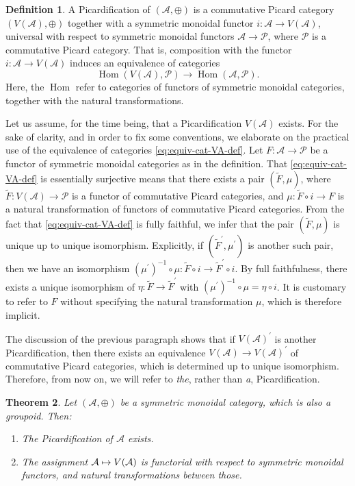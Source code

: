 \documentclass[JEP,XML,SOM,Unicode,published]{cedram}
\newcommand\mto{\mathchoice{\longmapsto}{\mapsto}{\mapsto}{\mapsto}}
\theoremstyle{plain}
\newtheorem{theorem}{Theorem}[section]
\theoremstyle{definition}
\newtheorem{definition}[theorem]{Definition}
\newcommand{\Acal}{\mathcal A}
\newcommand{\Pcal}{\mathcal P}
\DeclareMathOperator{\Hom}{Hom}
\begin{document}
\begin{definition}\label{def:Picardification}
A Picardification of $(\Acal, \oplus)$ is a commutative Picard category $(V(\Acal), \oplus)$ together with a symmetric monoidal functor $i\colon\Acal\to V(\Acal)$, universal with respect to symmetric monoidal functors $\Acal \to \Pcal$, where $\Pcal$ is a commutative Picard category. That is, composition with the functor $i\colon \Acal\to V(\Acal)$ induces an equivalence of categories
\begin{equation}\label{eq:equiv-cat-VA-def}
\Hom(V(\Acal),\Pcal)\to\Hom(\Acal,\Pcal).
\end{equation}
Here, the $\Hom$ refer to categories of functors of symmetric monoidal categories, together with the natural transformations.
\end{definition}
Let us assume, for the time being, that a Picardification $V(\Acal)$ exists. For the sake of clarity, and in order to fix some conventions, we elaborate on the practical use of the equivalence of categories \eqref{eq:equiv-cat-VA-def}. Let $F\colon\Acal\to\Pcal$ be a functor of symmetric monoidal categories as in the definition. That \eqref{eq:equiv-cat-VA-def} is essentially surjective means that there exists a pair $(\widetilde{F},\mu)$, where $\widetilde{F}\colon V(\Acal)\to\Pcal$ is a functor of commutative Picard categories, and $\mu\colon \widetilde{F}\circ i\to F$ is a natural transformation of functors of commutative Picard categories. From the fact that \eqref{eq:equiv-cat-VA-def} is fully faithful, we infer that the pair $(\widetilde{F},\mu)$ is unique up to unique isomorphism. Explicitly, if $(\widetilde{F}^{\prime},\mu^{\prime})$ is another such pair, then we have an isomorphism $(\mu^{\prime})^{-1}\circ\mu\colon \widetilde{F}\circ i\to\widetilde{F}^{\prime}\circ i $. By full faithfulness, there exists a unique isomorphism of $\eta\colon\widetilde{F}\to\widetilde{F}^{\prime}$ with $(\mu^{\prime})^{-1}\circ\mu=\eta\circ i$. It is customary to refer to $F$ without specifying the natural transformation $\mu$, which is therefore implicit.

The discussion of the previous paragraph shows that if $V(\Acal)^{\prime}$ is another Picardification, then there exists an equivalence $V(\Acal)\to V(\Acal)^{\prime}$ of commutative Picard categories, which is determined up to unique isomorphism. Therefore, from now on, we will refer to \emph{the}, rather than \emph{a}, Picardification.

\begin{theorem}\label{thm:VA}
Let $(\Acal, \oplus)$ be a symmetric monoidal category, which is also a groupoid. Then:
\begin{enumerate}
\item The Picardification of $\Acal$ exists.
\item The assignment $\Acal\mto V(\Acal)$ is functorial with respect to symmetric monoidal functors, and natural transformations between those.
\end{enumerate}
\end{theorem}
\end{document}
